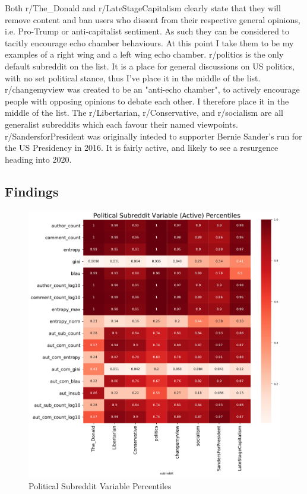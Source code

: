 Both r/The\_Donald and r/LateStageCapitalism clearly state that they will remove content and ban users who dissent from their respective general opinions, i.e. Pro-Trump or anti-capitalist sentiment. As such they can be considered to tacitly encourage echo chamber behaviours. At this point I take them to be my examples of a right wing and a left wing echo chamber. r/politics is the only default subreddit on the list. It is a place for general discussions on US politics, with no set political stance, thus I've place it in the middle of the list. r/changemyview was created to be an "anti-echo chamber", to actively encourage people with opposing opinions to debate each other. I therefore place it in the middle of the list. The r/Libertarian, r/Conservative, and r/socialism are all generalist subreddits which each favour their named viewpoints. r/SandersforPresident was originally inteded to supporter Bernie Sander's run for the US Presidency in 2016. It is fairly active, and likely to see a resurgence heading into 2020.

\subsection{Findings}

\begin{figure}
    \centering
    \includegraphics[scale=0.5]{latex/pol-heatmap.pdf}
    \caption{Political Subreddit Variable Percentiles}
    \label{pol-heatmap}
\end{figure}


